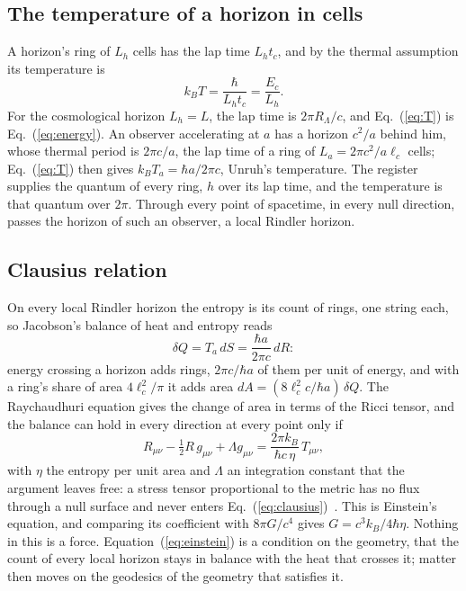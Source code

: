 \documentclass[aps,prd,twocolumn,superscriptaddress,nofootinbib,showkeys]{revtex4-2}
\newcommand{\lc}{\ell_c}
\newcommand{\tc}{t_c}
\newcommand{\Ec}{E_c}
\newcommand{\RL}{R_\Lambda}
\begin{document}
\subsection{The temperature of a horizon in cells}
A horizon's ring of $L_h$ cells has the lap time $L_h\tc$, and by the thermal assumption its temperature is
\begin{equation}
k_B T = \frac{\hbar}{L_h\tc} = \frac{\Ec}{L_h} .
\label{eq:T}
\end{equation}
For the cosmological horizon $L_h = L$, the lap time is $2\pi\RL/c$, and Eq.~(\ref{eq:T}) is Eq.~(\ref{eq:energy}). An observer accelerating at $a$ has a horizon $c^2/a$ behind him, whose thermal period is $2\pi c/a$, the lap time of a ring of $L_a = 2\pi c^2/a\lc$ cells; Eq.~(\ref{eq:T}) then gives $k_BT_a = \hbar a/2\pi c$, Unruh's temperature. The register supplies the quantum of every ring, $h$ over its lap time, and the temperature is that quantum over $2\pi$. Through every point of spacetime, in every null direction, passes the horizon of such an observer, a local Rindler horizon.

\subsection{Clausius relation}
On every local Rindler horizon the entropy is its count of rings, one string each, so Jacobson's balance of heat and entropy reads
\begin{equation}
\delta Q = T_a\,dS = \frac{\hbar a}{2\pi c}\,dR :
\label{eq:clausius}
\end{equation}
energy crossing a horizon adds rings, $2\pi c/\hbar a$ of them per unit of energy, and with a ring's share of area $4\lc^2/\pi$ it adds area $dA = (8\lc^2 c/\hbar a)\,\delta Q$. The Raychaudhuri equation gives the change of area in terms of the Ricci tensor, and the balance can hold in every direction at every point only if
\begin{equation}
R_{\mu\nu} - \tfrac12 R\,g_{\mu\nu} + \Lambda g_{\mu\nu} = \frac{2\pi k_B}{\hbar c\,\eta}\,T_{\mu\nu},
\label{eq:einstein}
\end{equation}
with $\eta$ the entropy per unit area and $\Lambda$ an integration constant that the argument leaves free: a stress tensor proportional to the metric has no flux through a null surface and never enters Eq.~(\ref{eq:clausius})~\cite{korytko2026b}. This is Einstein's equation, and comparing its coefficient with $8\pi G/c^4$ gives $G = c^3k_B/4\hbar\eta$. Nothing in this is a force. Equation~(\ref{eq:einstein}) is a condition on the geometry, that the count of every local horizon stays in balance with the heat that crosses it; matter then moves on the geodesics of the geometry that satisfies it.
\end{document}
